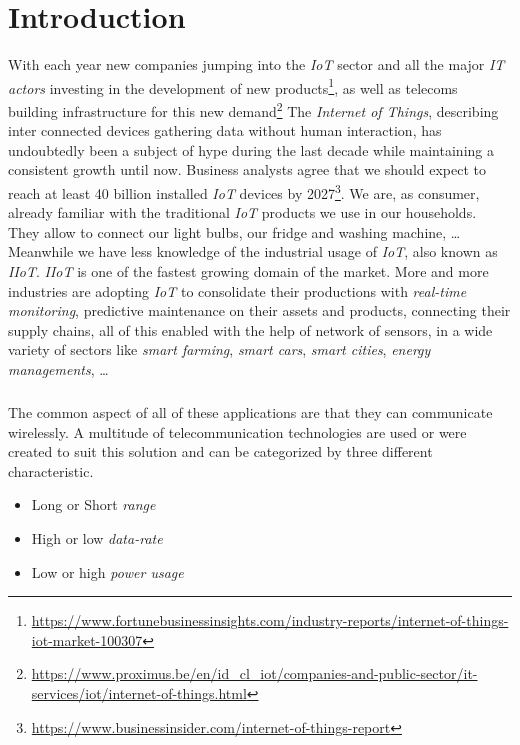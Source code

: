 \chapter{Introduction}

With each year new companies jumping into the \emph{IoT} sector and all the
major \emph{IT actors} investing in the development of new
products\footnote{\url{https://www.fortunebusinessinsights.com/industry-reports/internet-of-things-iot-market-100307}},
as well as telecoms building infrastructure for this new 
demand\footnote{\url{https://www.proximus.be/en/id_cl_iot/companies-and-public-sector/it-services/iot/internet-of-things.html}}
The \emph{Internet of Things}, describing inter connected devices gathering
data without human interaction, has undoubtedly been a subject of hype during the
last decade while maintaining a consistent growth until now.
Business analysts agree that we should expect to reach at least 40 billion
installed \emph{IoT} devices by
2027\footnote{\url{https://www.businessinsider.com/internet-of-things-report}}. 
We are, as consumer, already familiar with the traditional \emph{IoT} products
we use in our households. They allow to connect our light bulbs, our fridge and
washing machine, \ldots
Meanwhile we have less knowledge of the industrial usage of \emph{IoT}, also
known as \emph{IIoT}. \emph{IIoT} is one of the fastest growing domain of the
market. More and more industries are adopting \emph{IoT}  to consolidate their
productions with \emph{real-time monitoring}, predictive maintenance on their
assets and products, connecting their supply chains, all of this enabled with
the help of network of sensors, in a wide variety of
sectors like \emph{smart farming}, \emph{smart cars}, \emph{smart cities},
\emph{energy managements}, \ldots

\paragraph{}

The common aspect of all of these applications are that they can communicate
wirelessly.
A multitude of telecommunication technologies are used or were created to suit
this solution and can be categorized by three different characteristic.

\begin{itemize}
    \item Long or Short \emph{range}
    \item High or low \emph{data-rate}
    \item Low or high \emph{power usage} 
\end{itemize}

